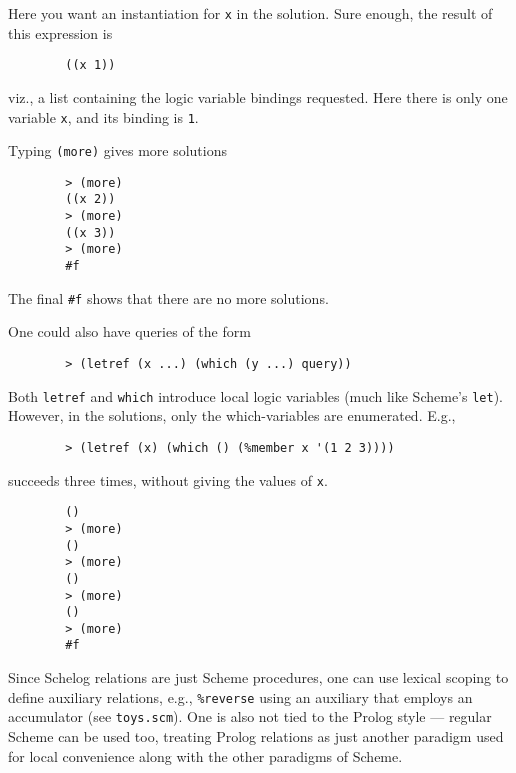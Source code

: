 \medskip
\par
Here you want an instantiation for \verb+x+ in the solution.  Sure
enough, the result of this expression is
\medskip
{\baselineskip=10pt
\begin{verbatim}
        ((x 1))
\end{verbatim}}
\medskip
\par
viz., a list containing the logic variable bindings
requested.  Here there is only one variable \verb+x+, and its
binding is \verb+1+.
\medskip
\par
Typing \verb+(more)+ gives more solutions
\medskip
{\baselineskip=10pt
\begin{verbatim}
        > (more)
        ((x 2))
        > (more)
        ((x 3))
        > (more)
        #f
\end{verbatim}}
\medskip
\par
The final \verb+#f+ shows that there are no more solutions.
\medskip
\par
One could also have queries of the form
\medskip
{\baselineskip=10pt
\begin{verbatim}
        > (letref (x ...) (which (y ...) query))
\end{verbatim}}
\medskip
\par
Both \verb+letref+ and \verb+which+ introduce local logic variables (much
like Scheme's \verb+let+).  However, in the solutions, only the
which-variables are enumerated.  E.g.,
\medskip
{\baselineskip=10pt
\begin{verbatim}
        > (letref (x) (which () (%member x '(1 2 3))))
\end{verbatim}}
\medskip
\par
succeeds three times, without giving the values of \verb+x+.
\medskip
{\baselineskip=10pt
\begin{verbatim}
        ()
        > (more)
        ()
        > (more)
        ()
        > (more)
        ()
        > (more)
        #f
\end{verbatim}}
\medskip
\par
Since Schelog relations are just Scheme procedures, one can
use lexical scoping to define auxiliary relations, e.g.,
\verb+%reverse+ using an auxiliary that employs an accumulator (see
\verb+toys.scm+).  One is also not tied to the Prolog style ---
regular Scheme can be used too, treating Prolog relations as
just another paradigm used for local convenience along with
the other paradigms of Scheme.

